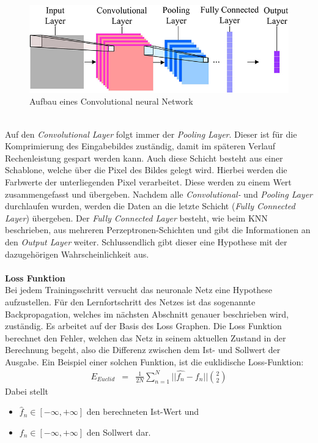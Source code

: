 \begin{figure}
	[h]
	\centering
	\includegraphics[scale=0.5]{Sources/cnnet.jpg}
	\caption{Aufbau eines Convolutional neural Network \cite{info7040061}}
	\label{img:cnn}
\end{figure}\\
Auf den \textit{Convolutional Layer} folgt immer der \textit{Pooling Layer}. Dieser ist für die Komprimierung des Eingabebildes zuständig, damit im späteren Verlauf Rechenleistung gespart werden kann. Auch diese Schicht besteht aus einer Schablone, welche über die Pixel des Bildes gelegt wird. Hierbei werden die Farbwerte der unterliegenden Pixel verarbeitet. Diese werden zu einem Wert zusammengefasst und übergeben. Nachdem alle \textit{Convolutional-} und \textit{Pooling Layer} durchlaufen wurden, werden die Daten an die letzte Schicht (\textit{Fully Connected Layer}) übergeben. Der \textit{Fully Connected Layer} besteht, wie beim KNN beschrieben, aus mehreren Perzeptronen-Schichten und gibt die Informationen an den \textit{Output Layer} weiter. Schlussendlich gibt dieser eine Hypothese mit der dazugehörigen Wahrscheinlichkeit aus.\\\\
\textbf{Loss Funktion}\\
Bei jedem Trainingsschritt versucht das neuronale Netz eine Hypothese aufzustellen. Für den Lernfortschritt des Netzes ist das sogenannte Backpropagation, welches im nächsten Abschnitt genauer beschrieben wird, zuständig. Es arbeitet auf der Basis des Loss Graphen. Die Loss Funktion berechnet den Fehler, welchen das Netz in seinem aktuellen Zustand in der Berechnung begeht, also die Differenz zwischen dem Ist- und Sollwert der Ausgabe. Ein Beispiel einer solchen Funktion, ist die euklidische Loss-Funktion:
\begin{eqnarray} E_{Euclid}&=&\frac{1}{2N} \sum_{n=1}^N || \hat{f_{n}}-f_{n} || \binom{2}{2} \end{eqnarray}
Dabei stellt
\begin{itemize}
	\item[] $\hat{f}_{n} \in [-\infty,+\infty]$ den berechneten Ist-Wert und
	\item[] $f_{n} \in [-\infty,+\infty]$ den Sollwert dar.
\end{itemize}
